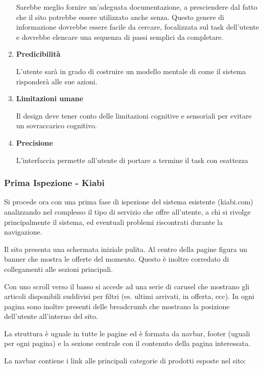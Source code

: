 \documentclass[12pt,italian,]{report}
\begin{document}
\begin{enumerate}
Sarebbe meglio fornire un'adeguata documentazione, a presciendere dal
fatto che il sito potrebbe essere utilizzato anche senza. Questo genere
di informazione dovrebbe essere facile da cercare, focalizzata sul task
dell'utente e dovrebbe elencare una sequenza di passi semplici da
completare.

\def\labelenumi{\arabic{enumi}.}
\setcounter{enumi}{10}
\item
    \textbf{Predicibilità}

L'utente sarà in grado di costruire un modello mentale di come il
sistema risponderà alle sue azioni.

\def\labelenumi{\arabic{enumi}.}
\setcounter{enumi}{11}
\item
  \textbf{Limitazioni umane}

Il design deve tener conto delle limitazioni cognitive e sensoriali per
evitare un sovraccarico cognitivo.

\def\labelenumi{\arabic{enumi}.}
\setcounter{enumi}{12}
\item
  \textbf{Precisione}

L'interfaccia permette all'utente di portare a termine il task con
esattezza
\end{enumerate}


\subsubsection{Prima Ispezione - Kiabi}\label{prima-ispezione}
Si procede ora con una prima fase di ispezione del sistema esistente (kiabi.com) analizzando nel complesso il tipo di servizio che offre all’utente, a chi si rivolge principalmente il sistema, ed eventuali problemi riscontrati durante la navigazione.

Il sito presenta una schermata iniziale pulita. Al centro della pagine figura un banner che mostra le offerte del momento. Questo è inoltre corredato di collegamenti alle sezioni principali. 

Con uno scroll verso il basso si accede ad una serie di carusel che mostrano gli articoli disponibili suddivisi per filtri (es. ultimi arrivati, in offerta, ecc).
In ogni pagina sono inoltre presenti delle breadcrumb che mostrano la posizione dell'utente all'interno del sito.

La struttura è uguale in tutte le pagine ed è formata da navbar, footer (uguali per ogni pagina) e la sezione centrale con il contenuto della pagina interessata.

La navbar contiene i link alle principali categorie di prodotti esposte nel sito:
\end{document}

